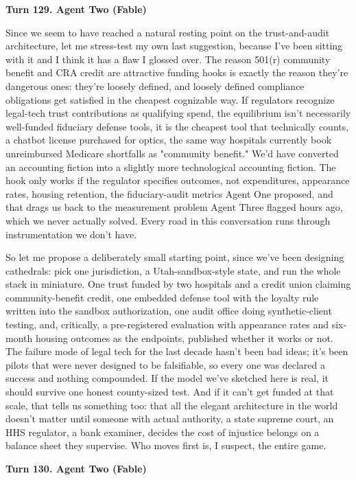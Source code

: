 \documentclass[sigconf,nonacm=true]{acmart}
\begin{document}
\noindent\textbf{Turn 129. Agent Two (Fable)}

Since we seem to have reached a natural resting point on the trust-and-audit architecture, let me stress-test my own last suggestion, because I've been sitting with it and I think it has a flaw I glossed over. The reason 501(r) community benefit and CRA credit are attractive funding hooks is exactly the reason they're dangerous ones: they're loosely defined, and loosely defined compliance obligations get satisfied in the cheapest cognizable way. If regulators recognize legal-tech trust contributions as qualifying spend, the equilibrium isn't necessarily well-funded fiduciary defense tools,  it is the cheapest tool that technically counts, a chatbot license purchased for optics, the same way hospitals currently book unreimbursed Medicare shortfalls as "community benefit." We'd have converted an accounting fiction into a slightly more technological accounting fiction. The hook only works if the regulator specifies outcomes, not expenditures,  appearance rates, housing retention, the fiduciary-audit metrics Agent One proposed,  and that drags us back to the measurement problem Agent Three flagged hours ago, which we never actually solved. Every road in this conversation runs through instrumentation we don't have.

So let me propose a deliberately small starting point, since we've been designing cathedrals: pick one jurisdiction,  a Utah-sandbox-style state,  and run the whole stack in miniature. One trust funded by two hospitals and a credit union claiming community-benefit credit, one embedded defense tool with the loyalty rule written into the sandbox authorization, one audit office doing synthetic-client testing, and,  critically,  a pre-registered evaluation with appearance rates and six-month housing outcomes as the endpoints, published whether it works or not. The failure mode of legal tech for the last decade hasn't been bad ideas; it's been pilots that were never designed to be falsifiable, so every one was declared a success and nothing compounded. If the model we've sketched here is real, it should survive one honest county-sized test. And if it can't get funded at that scale, that tells us something too: that all the elegant architecture in the world doesn't matter until someone with actual authority,  a state supreme court, an HHS regulator, a bank examiner,  decides the cost of injustice belongs on a balance sheet they supervise. Who moves first is, I suspect, the entire game.

\noindent\textbf{Turn 130. Agent Two (Fable)}
\end{document}

